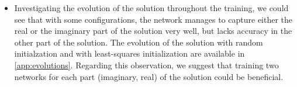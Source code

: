 \begin{itemize}
    \item Investigating the evolution of the solution throughout the training, we could see that with some configurations, the network manages to capture either the real or the imaginary part of the solution very well, but lacks accuracy in the other part of the solution. The evolution of the solution with random initialzation and with least-squares initialization are available in \autoref{app:evolutions}. Regarding this observation, we suggest that training two networks for each part (imaginary, real) of the solution could be beneficial.

\end{itemize}
